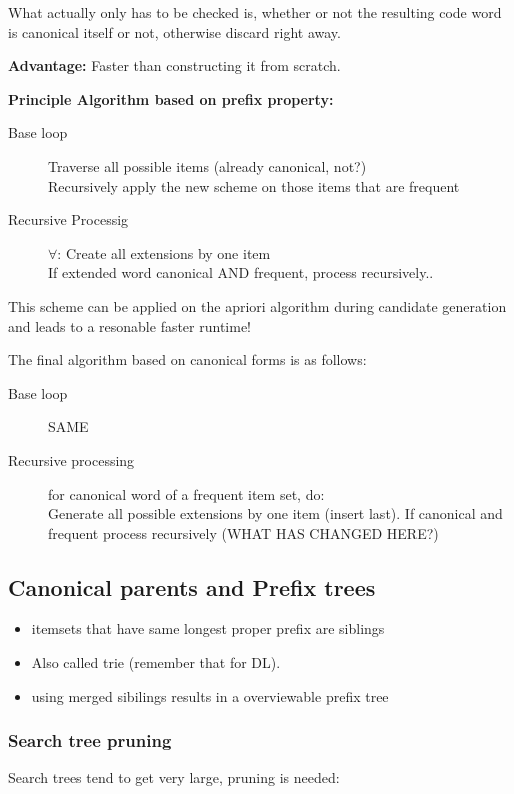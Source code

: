 \documentclass[fleqn, oneside, 10pt, titlepage]{article}
\begin{document}
What actually only has to be checked is, whether or not the resulting code word is canonical itself or not, otherwise discard right away.

\textbf{Advantage:} Faster than constructing it from scratch.

\textbf{Principle Algorithm based on prefix property:}
\begin{description}
\item[Base loop] Traverse all possible items (already canonical, not?)\\
	Recursively apply the new scheme on those items that are frequent
	
\item[Recursive Processig] $\forall$: Create all extensions by one item\\
	If extended word canonical AND frequent, process recursively..
\end{description}

This scheme can be applied on the apriori algorithm during candidate generation and leads to a resonable faster runtime!

The final algorithm based on canonical forms is as follows:

\begin{description}
\item[Base loop] SAME
\item[Recursive processing] for canonical word of a frequent item set, do:\\
	Generate all possible extensions by one item (insert last). If canonical and frequent process recursively (WHAT HAS CHANGED HERE?)
\end{description}

\subsection{Canonical parents and Prefix trees}
\begin{itemize}
\item itemsets that have same longest proper prefix are siblings
\item Also called trie (remember that for DL).
\item using merged sibilings results in a overviewable prefix tree
\end{itemize}

\subsubsection{Search tree pruning}
Search trees tend to get very large, pruning is needed:
\end{document}
